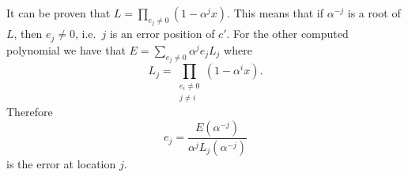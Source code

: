 \documentclass{article}
\begin{document}
It can be proven that $L=\prod_{e_j \neq 0}\left( 1 - \alpha^{j}x \right)$. This means that if $\alpha^{-j}$ is a root of $L$, then $e_j \neq 0$, i.e.\ $j$ is an error position of $c'$.
For the other computed polynomial we have that $E = \sum_{e_j \neq 0} \alpha^{j} e_j L_j$ where 
\[
    L_j = \prod_{\substack{e_i \neq 0 \\ j \neq i}} \left( 1 -\alpha^i x\right).
\]
Therefore
\[
    e_j = \frac{E(\alpha^{-j})}{\alpha^{j}L_j(\alpha^{-j})}
\]
is the error at location $j$.
\end{document}
